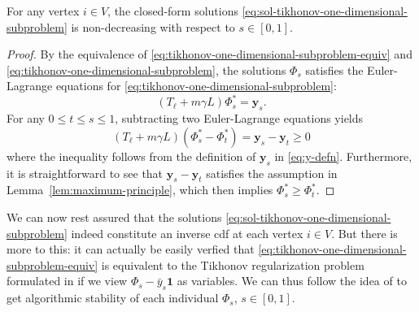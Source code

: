 \documentclass[letterpaper]{article} %
\begin{document}
\begin{proposition}
  For any vertex $i\in V$, the closed-form solutions \eqref{eq:sol-tikhonov-one-dimensional-subproblem} is non-decreasing with respect to $s\in \left[ 0,1 \right]$.
\end{proposition}
\begin{proof}
  By the equivalence of \eqref{eq:tikhonov-one-dimensional-subproblem-equiv} and \eqref{eq:tikhonov-one-dimensional-subproblem}, the solutions $\Phi_s$ satisfies the Euler-Lagrange equations for \eqref{eq:tikhonov-one-dimensional-subproblem}:
  \begin{equation*}
    \left( T_{\ell}+m\gamma L \right)\Phi_s^{*}=\mathbf{y}_s.
  \end{equation*}
  For any $0\leq t\leq s\leq 1$, subtracting two Euler-Lagrange equations yields
  \begin{equation*}
    \left( T_{\ell}+m\gamma L \right)\left(\Phi_s^{*}-\Phi_t^{*}\right)=\mathbf{y}_s-\mathbf{y}_t\geq 0
  \end{equation*}
  where the inequality follows from the definition of $\mathbf{y}_s$ in \eqref{eq:y-defn}. Furthermore, it is straightforward to see that $\mathbf{y}_s-\mathbf{y}_t$ satisfies the assumption in Lemma~\ref{lem:maximum-principle}, which then implies $\Phi_s^{*}\geq \Phi_t^{*}$.
\end{proof}

We can now rest assured that the solutions \eqref{eq:sol-tikhonov-one-dimensional-subproblem} indeed constitute an inverse cdf at each vertex $i\in V$. But there is more to this: it can actually be easily verfied that \eqref{eq:tikhonov-one-dimensional-subproblem-equiv} is equivalent to the Tikhonov regularization problem formulated in \cite{Belkin2004} if we view $\Phi_s-\bar{y}_s\mathbf{1}$ as variables. We can thus follow the idea of \cite[Theorem 5]{Belkin2004} to get algorithmic stability of each individual $\Phi_s$, $s\in \left[ 0,1 \right]$.
\end{document}

